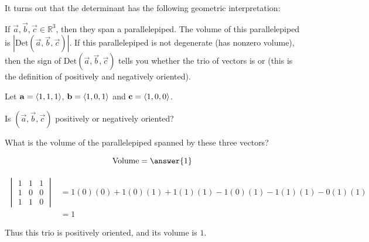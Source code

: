 \documentclass{ximera}
\begin{document}
	It turns out that the determinant has the following geometric interpretation:
	
	\begin{theorem}
		If $\vec{a},\vec{b},\vec{c} \in \mathbb{R}^3$, then they span a parallelepiped. The volume of this parallelepiped is $\left|\textrm{Det}(\vec{a},\vec{b},\vec{c})\right|$. If this parallelepiped is not degenerate (has nonzero volume), then the sign of $\textrm{Det}(\vec{a},\vec{b},\vec{c})$ tells you whether the trio of vectors is  or  (this is the definition of positively and negatively oriented).
	\end{theorem} 
	
	\begin{question}
		Let $\mathbf{a} = \left\langle 1,1,1\right\rangle$, $\mathbf{b} = \left\langle 1,0,1\right\rangle$ and $\mathbf{c} = \left\langle 1,0,0\right\rangle$.
		
		Is $(\vec{a},\vec{b},\vec{c})$ positively or negatively oriented?
		
		\begin{multipleChoice}
		\end{multipleChoice}
		
		What is the volume of the parallelepiped spanned by these three vectors?
		
		\[
		\textrm{Volume} = \answer{1}
		\]
		
		\begin{hint}
			\begin{align*}
				\begin{vmatrix}
					1 & 1 & 1\\
					1 & 0 & 0\\
					1 & 1 & 0
				\end{vmatrix} &=
				1(0)(0)+1(0)(1)+1(1)(1)-1(0)(1)-1(1)(1)-0(1)(1)\\
				&=1
			\end{align*}
			
			Thus this trio is positively oriented, and its volume is $1$.
		\end{hint}
	\end{question}
	
\end{document}
